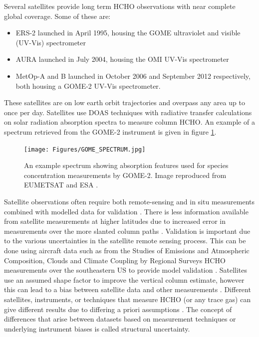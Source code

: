       Several satellites provide long term HCHO observations with near complete global coverage. 
      Some of these are:
      \begin{itemize}
        \item  ERS-2 launched in April 1995, housing the GOME ultraviolet and visible (UV-Vis) spectrometer
        \item AURA launched in July 2004, housing the OMI UV-Vis spectrometer
        \item MetOp-A and B launched in October 2006 and September 2012 respectively, both housing a GOME-2 UV-Vis spectrometer.
      \end{itemize}
      These satellites are on low earth orbit trajectories and overpass any area up to once per day.
      Satellites use DOAS techniques with radiative transfer calculations on solar radiation absorption spectra to measure column HCHO.
      An example of a spectrum retrieved from the GOME-2 instrument is given in figure \ref{LR:HCHO:Sat:fig_GOME_products}.
      
      \begin{figure}
        \texttt{[image: Figures/GOME\_SPECTRUM.jpg]}
        \caption{%
          An example spectrum showing absorption features used for species concentration measurements by GOME-2. Image reproduced from EUMETSAT and ESA \parencite{GOME2Image}.
          }
        \label{LR:HCHO:Sat:fig_GOME_products}
      \end{figure}
      
      Satellite observations often require both remote-sensing and in situ measurements combined with modelled data for validation \parencite{Marais2014}.
      There is less information available from satellite measurements at higher latitudes due to increased error in measurements over the more slanted column paths \parencite{DeSmedt2015}.
      Validation is important due to the various uncertainties in the satellite remote sensing process.
      This can be done using aircraft data such as from the Studies of Emissions and Atmospheric Composition, Clouds and Climate Coupling by Regional Surveys HCHO measurements over the southeastern US to provide model validation 
      \parencite[e.g.,][]{Zhu2016}. 
      Satellites use an assumed shape factor to improve the vertical column estimate, however this can lead to a bias between satellite data and other measurements \parencite{Zhu2016}.
      Different satellites, instruments, or techniques that measure HCHO (or any trace gas) can give different results due to differing a priori assumptions \parencite{Lorente2017}.
      The concept of differences that arise between datasets based on measurement techniques or underlying instrument biases is called structural uncertainty.
      

